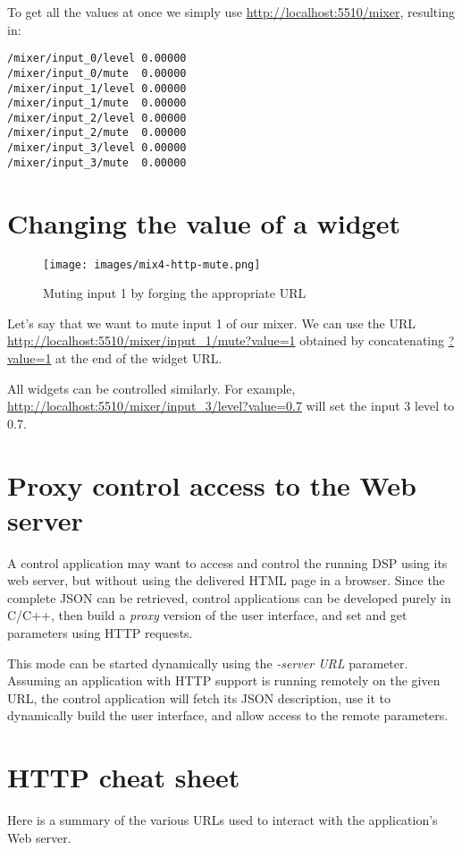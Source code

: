 To get all the values at once we simply use \url{http://localhost:5510/mixer}, resulting in:
\begin{lstlisting}
/mixer/input_0/level 0.00000 
/mixer/input_0/mute  0.00000 
/mixer/input_1/level 0.00000 
/mixer/input_1/mute  0.00000 
/mixer/input_2/level 0.00000 
/mixer/input_2/mute  0.00000 
/mixer/input_3/level 0.00000 
/mixer/input_3/mute  0.00000 
\end{lstlisting}

\section{Changing the value of a widget}

\begin{figure}[h!]
  \centering
  \texttt{[image: images/mix4-http-mute.png]}
  \caption{Muting input 1 by forging the appropriate URL}   
  \label{fig:mix4-http-mute}
\end{figure}

Let's say that we want to mute input 1 of our mixer. We can use the URL \url{http://localhost:5510/mixer/input_1/mute?value=1} obtained by concatenating \url{?value=1} at the end of the widget URL. 

All widgets can be controlled similarly. For example, \url{http://localhost:5510/mixer/input_3/level?value=0.7} will set the input 3 level to 0.7.

\section{Proxy control access to the Web server}

A control application may want to access and control the running DSP using its web server, but without using the delivered HTML page in a browser. Since the complete JSON can be retrieved, control applications can be developed purely in C/C++, then build a \textit{proxy} version of the user interface, and set and get parameters using HTTP requests. 

This mode can be started dynamically using the \textit{-server URL} parameter. Assuming an application with HTTP support is running remotely on the given URL, the control application will fetch its JSON description, use it to dynamically build the user interface, and allow access to the remote parameters.

\section{HTTP cheat sheet}
Here is a summary of the various URLs used to interact with the application's Web server.
